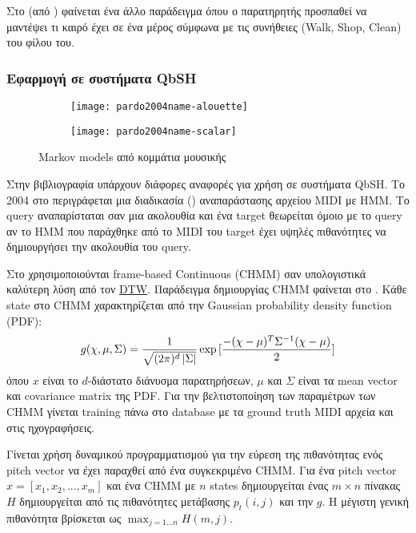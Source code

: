Στο  (από \cite{wikiHMM}) φαίνεται ένα άλλο παράδειγμα \hmm{} όπου ο παρατηρητής προσπαθεί να μαντέψει τι καιρό έχει σε ένα μέρος σύμφωνα με τις συνήθειες (Walk, Shop, Clean) του φίλου του.

\subsubsection{Εφαρμογή σε συστήματα QbSH}
\begin{figure}
    \centering
    \begin{subfigure}{0.45\linewidth}
        \texttt{[image: pardo2004name-alouette]}
    \end{subfigure}\hfill
    \begin{subfigure}{0.45\linewidth}
        \texttt{[image: pardo2004name-scalar]}
    \end{subfigure}
    \caption{Markov models από κομμάτια μουσικής \protect\cite{pardo2004name}}
    \label{fig:pardo2004name-alouette}
\end{figure}

Στην βιβλιογραφία υπάρχουν διάφορες αναφορές για χρήση \hmm{} σε συστήματα QbSH.
Το 2004 στο \cite{pardo2004name} περιγράφεται μια διαδικασία () αναπαράστασης αρχείου MIDI με HMM.
Το query αναπαρίσταται σαν μια ακολουθία και ένα target θεωρείται όμοιο με το query αν το HMM που παράχθηκε από το MIDI του target έχει υψηλές πιθανότητες να δημιουργήσει την ακολουθία του query.

Στο \cite{jang2005continuous} χρησιμοποιούνται frame-based Continuous \hmm{} (CHMM) σαν υπολογιστικά καλύτερη λύση από τον \hyperref[sub:DTW]{DTW}.
Παράδειγμα δημιουργίας CHMM φαίνεται στο .
Κάθε state στο CHMM χαρακτηρίζεται από την Gaussian probability density function (PDF):
\begin{equation*}
    g(\chi, \mu, \Sigma) = \frac{1}{\sqrt{(2\pi)^d\left\lvert\Sigma\right\rvert}} \exp{[\frac{-(\chi-\mu)^T\Sigma^{-1}(\chi-\mu)}{2}]}
\end{equation*}
όπου $x$ είναι το $d$-διάστατο διάνυσμα παρατηρήσεων, $\mu$ και $\Sigma$ είναι τα mean vector και covariance matrix της PDF.
Για την βελτιστοποίηση των παραμέτρων των CHMM γίνεται training πάνω στο database με τα ground truth MIDI αρχεία και στις ηχογραφήσεις.

Γίνεται χρήση δυναμικού προγραμματισμού για την εύρεση της πιθανότητας ενός pitch vector να έχει παραχθεί από ένα συγκεκριμένο CHMM.
Για ένα pitch vector $x = [x_1, x_2, ..., x_m]$ και ένα CHMM με $n$ states δημιουργείται ένας $m \times n$ πίνακας $H$ δημιουργείται από τις πιθανότητες μετάβασης $p_t(i,j)$ και την $g$.
Η μέγιστη γενική πιθανότητα βρίσκεται ως $\max_{j=1...n}{H(m,j)}$.

